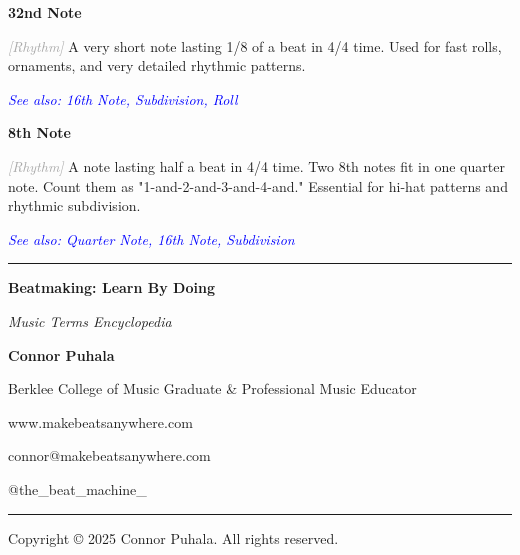 \documentclass[11pt,letterpaper]{article}
\newcommand{\term}[1]{\textbf{\large\color{purple}#1}}
\newcommand{\category}[1]{\textcolor{darkgray}{\textit{\small [#1]}}}
\newcommand{\seealso}[1]{\textcolor{blue}{\textit{See also: #1}}}
\newenvironment{termdef}[1]
  {\noindent\term{#1}\par\nopagebreak}
  {\par\vspace{0.3em}}
\begin{document}
\begin{termdef}{32nd Note}
\category{Rhythm}
A very short note lasting 1/8 of a beat in 4/4 time. Used for fast rolls, ornaments, and very detailed rhythmic patterns.

\seealso{16th Note, Subdivision, Roll}
\end{termdef}

\begin{termdef}{8th Note}
\category{Rhythm}
A note lasting half a beat in 4/4 time. Two 8th notes fit in one quarter note. Count them as "1-and-2-and-3-and-4-and." Essential for hi-hat patterns and rhythmic subdivision.

\seealso{Quarter Note, 16th Note, Subdivision}
\end{termdef}

\newpage


\begin{center}
\rule{0.8\textwidth}{0.5pt}

\vspace{0.5cm}

{\Large\textbf{Beatmaking: Learn By Doing}}

\vspace{0.3cm}

\textit{Music Terms Encyclopedia}

\vspace{0.5cm}

\textbf{Connor Puhala}

Berklee College of Music Graduate \& Professional Music Educator

\vspace{0.3cm}

www.makebeatsanywhere.com

connor@makebeatsanywhere.com

@the\_beat\_machine\_

\vspace{0.5cm}

\rule{0.8\textwidth}{0.5pt}

\vspace{0.3cm}

{\small Copyright © 2025 Connor Puhala. All rights reserved.}
\end{center}
\end{document}
